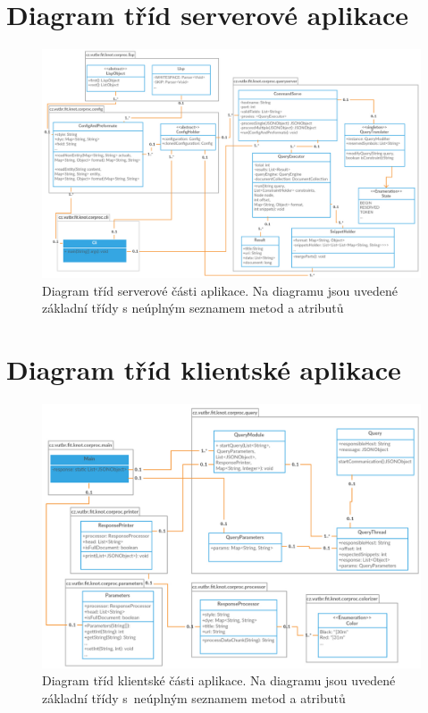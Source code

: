 \section{Diagram tříd serverové aplikace}
\renewcommand{\bottomfraction}{0.85}
\begin{figure}[ht]
\vspace*{-3cm}
	\includegraphics[scale=0.38, angle=90]{obrazky-figures/ClassDiagrameServer.png}
	\caption{Diagram tříd serverové části aplikace. Na diagramu jsou uvedené základní třídy s neúplným seznamem metod a atributů}
    \label{ClassDiagramServerLbl}
\end{figure}

\section{Diagram tříd klientské aplikace}
\begin{figure}[ht]
\vspace*{-3cm}
	\includegraphics[scale=0.45, angle=90]{obrazky-figures/ClientClassDiagram.png}
	\caption{Diagram tříd klientské části aplikace. Na diagramu jsou uvedené základní třídy s~neúplným seznamem metod a atributů}
    \label{ClientClassDiagrameLbl}
\end{figure}

